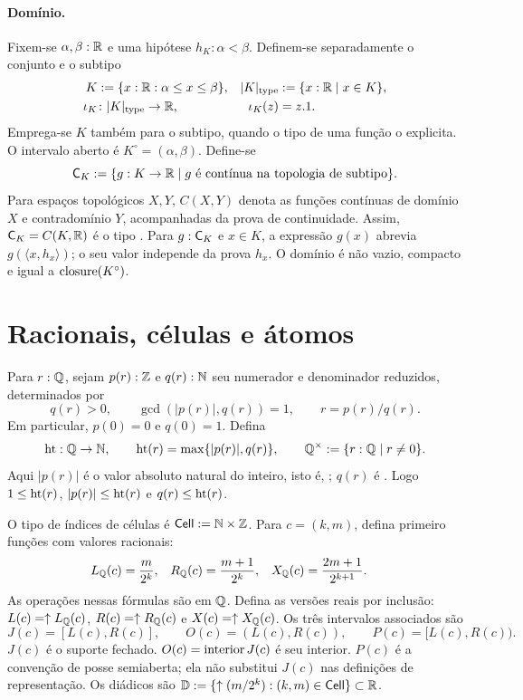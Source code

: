 \paragraph{Domínio.}
Fixem-se $\alpha,\beta:\mathbb R$ e uma hipótese $h_K:\alpha<\beta$.
Definem-se separadamente o conjunto e o subtipo
\begin{align*}
 K &:= \{x:\mathbb R:\alpha\le x\le\beta\}, &
 |K|_{\rm type} &:= \{x:\mathbb R\mid x\in K\},\\
 \iota_K &\colon |K|_{\rm type}\to\mathbb R, &
 \iota_K(z) &= z.1.
\end{align*}
Emprega-se $K$ também para o subtipo, quando o tipo de uma função o explicita.
O intervalo aberto é $K^\circ=(\alpha,\beta)$.
Define-se
\[
 \mathsf C_K:=\{g:K\to\mathbb R\mid g\text{ é contínua na topologia de subtipo}\}.
\]
Para espaços topológicos $X,Y$, $C(X,Y)$ denota as funções contínuas
de domínio $X$ e contradomínio $Y$, acompanhadas da prova de continuidade.
Assim, $\mathsf C_K=C(K,\mathbb R)$ é o tipo
. Para $g:\mathsf C_K$ e $x\in K$, a expressão $g(x)$ abrevia
$g(\langle x,h_x\rangle)$; o seu valor independe da prova $h_x$.
O domínio é não vazio, compacto e igual a $\operatorname{closure}(K^\circ)$.

\section{Racionais, células e átomos}
\label{normalizacao:sec:objects}

\begin{definicao}\label{map:normalizacao:2.1}
Para $r:\mathbb Q$, sejam $p(r):\mathbb Z$ e $q(r):\mathbb N$ seu numerador e denominador
reduzidos, determinados por
\[
 q(r)>0,\qquad \gcd(|p(r)|,q(r))=1,\qquad r=p(r)/q(r).
\]
Em particular, $p(0)=0$ e $q(0)=1$. Defina
\[
 \operatorname{ht}:\mathbb Q\to\mathbb N,\qquad \operatorname{ht}(r)=\max\{|p(r)|,q(r)\},\qquad
 \mathbb Q^{\times}:=\{r:\mathbb Q\mid r\ne0\}.
\]
Aqui $|p(r)|$ é o valor absoluto natural do inteiro, isto é,
; $q(r)$ é . Logo
$1\le\operatorname{ht}(r)$, $|p(r)|\le\operatorname{ht}(r)$ e $q(r)\le\operatorname{ht}(r)$.
\end{definicao}

\begin{definicao}\label{map:normalizacao:2.2}
O tipo de índices de células é $\mathsf{Cell}:=\mathbb N\times\mathbb Z$. Para $c=(k,m)$,
defina primeiro funções com valores racionais:
\begin{align*}
 L_\mathbb Q(c)&=\frac{m}{2^k},&
 R_\mathbb Q(c)&=\frac{m+1}{2^k},&
 X_\mathbb Q(c)&=\frac{2m+1}{2^{k+1}}.
\end{align*}
As operações nessas fórmulas são em $\mathbb Q$. Defina as versões reais por
inclusão: $L(c)=\uparrow L_\mathbb Q(c)$, $R(c)=\uparrow R_\mathbb Q(c)$ e
$X(c)=\uparrow X_\mathbb Q(c)$. Os três intervalos associados são
\[
 J(c)=[L(c),R(c)],\qquad O(c)=(L(c),R(c)),\qquad
 P(c)=[L(c),R(c)).
\]
$J(c)$ é o suporte fechado. $O(c)=\operatorname{interior} J(c)$ é seu interior.
$P(c)$ é a convenção de posse semiaberta; ela não substitui $J(c)$
nas definições de representação.
Os diádicos são
$\mathbb D:=\{\uparrow(m/2^k):(k,m)\in\mathsf{Cell}\}\subset\mathbb R$.
\end{definicao}

